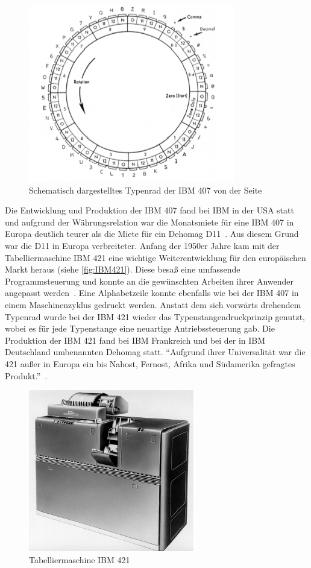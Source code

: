 \documentclass[parskip=half]{scrartcl}
\begin{document}
\begin{figure}[h]
  \centering
  \includegraphics{typenrad}
  \caption{Schematisch dargestelltes Typenrad der IBM 407 von der Seite~\cite{sandner}}
  \label{fig:typenrad}
\end{figure}

Die Entwicklung und Produktion der IBM 407 fand bei IBM in der USA statt und
aufgrund der Währungsrelation war die Monatsmiete für eine IBM 407 in Europa
deutlich teurer als die Miete für ein Dehomag D11~\cite{sandner}. Aus diesem
Grund war die D11 in Europa verbreiteter. Anfang der 1950er Jahre kam mit der
Tabelliermaschine IBM 421 eine wichtige Weiterentwicklung für den europäischen
Markt heraus (siehe \autoref{fig:IBM421}). Diese besaß eine umfassende
Programmsteuerung und konnte an die gewünschten Arbeiten ihrer Anwender
angepasst werden~\cite{deutschesMuseum}. Eine Alphabetzeile konnte ebenfalls
wie bei der IBM 407 in einem Maschinenzyklus gedruckt werden. Anstatt dem sich
vorwärts drehendem Typenrad wurde bei der IBM 421 wieder das
Typenstangendruckprinzip genutzt, wobei es für jede Typenstange eine neuartige
Antriebssteuerung gab. Die Produktion der IBM 421 fand bei IBM Frankreich und
bei der in IBM Deutschland umbenannten Dehomag statt. \enquote{Aufgrund ihrer
Universalität war die 421 außer in Europa ein bis Nahost, Fernost, Afrika und
Südamerika gefragtes Produkt.}~\cite{sandner}.

\begin{figure}[h]
  \centering
  \includegraphics{IBM421}
  \caption{Tabelliermaschine IBM 421~\cite{sandner}}
  \label{fig:IBM421}
\end{figure}
\end{document}
